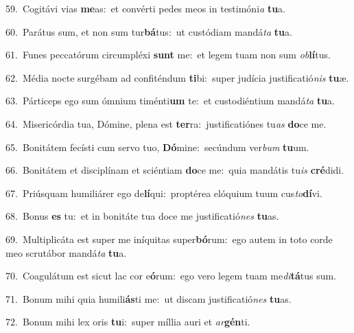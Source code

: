 {\numbfont\textcolor{\numbcolor}{59.}}~Cogitávi vias \textbf{me}\-as:~\star et convérti pedes meos in testimóni\textit{a} \textbf{tu}\-a.\par
{\numbfont\textcolor{\numbcolor}{60.}}~Parátus sum, et non sum tur\-\textbf{bá}\-tus:~\star ut custódiam mandá\textit{ta} \textbf{tu}\-a.\par
{\numbfont\textcolor{\numbcolor}{61.}}~Funes peccatórum circumpléxi \textbf{sunt} me:~\star et legem tuam non sum \textit{ob}\-\textbf{lí}tus.\par
{\numbfont\textcolor{\numbcolor}{62.}}~Média nocte surgébam ad confiténdum \textbf{ti}\-bi:~\star super judícia justificatió\textit{nis} \textbf{tu}\-æ.\par
{\numbfont\textcolor{\numbcolor}{63.}}~Párticeps ego sum ómnium timénti\textbf{um} te:~\star et custodiéntium mandá\textit{ta} \textbf{tu}\-a.\par
{\numbfont\textcolor{\numbcolor}{64.}}~Misericórdia tua, Dómine, plena est \textbf{ter}\-ra:~\star justificatiónes tu\textit{as} \textbf{do}\-ce me.\par
{\numbfont\textcolor{\numbcolor}{65.}}~Bonitátem fecísti cum servo tuo, \textbf{Dó}\-mine:~\star secúndum ver\textit{bum} \textbf{tu}\-um.\par
{\numbfont\textcolor{\numbcolor}{66.}}~Bonitátem et disciplínam et sciéntiam \textbf{do}\-ce me:~\star quia mandátis tu\textit{is} \textbf{cré}\-didi.\par
{\numbfont\textcolor{\numbcolor}{67.}}~Priúsquam humiliárer ego de\-\textbf{lí}\-qui:~\star proptérea elóquium tuum cus\-\textit{to}\-\textbf{dí}vi.\par
{\numbfont\textcolor{\numbcolor}{68.}}~Bonus \textbf{es} tu:~\star et in bonitáte tua doce me justificatió\textit{nes} \textbf{tu}\-as.\par
{\numbfont\textcolor{\numbcolor}{69.}}~Multiplicáta est super me iníquitas super\-\textbf{bó}\-rum:~\star ego autem in toto corde meo scrutábor mandá\textit{ta} \textbf{tu}\-a.\par
{\numbfont\textcolor{\numbcolor}{70.}}~Coagulátum est sicut lac cor e\-\textbf{ó}\-rum:~\star ego vero legem tuam me\-\textit{di}\-\textbf{tá}tus sum.\par
{\numbfont\textcolor{\numbcolor}{71.}}~Bonum mihi quia humili\-\textbf{ás}\-ti me:~\star ut discam justificatió\textit{nes} \textbf{tu}\-as.\par
{\numbfont\textcolor{\numbcolor}{72.}}~Bonum mihi lex oris \textbf{tu}\-i:~\star super míllia auri et \textit{ar}\-\textbf{gén}ti.\par
